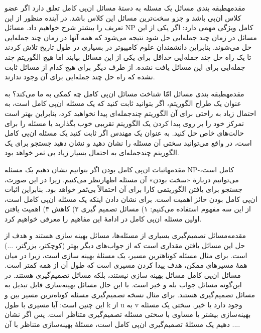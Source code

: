 \begin{itemframe-s}{مقدمه}{طبقه بندی مسائل}
\itm
یک مسئله به دستهٔ مسائل ان‌پی کامل
تعلق دارد اگر عضو کلاس ان‌پی باشد و جزو سخت‌ترین مسائل این کلاس باشد. در آینده منظور از این تعریف را بیشتر شرح خواهیم داد.
\itm
مسائل NP کامل ویژگی مهمی دارد: اگر یکی از این مسائل در زمان چند جمله‌ایی حل شود نتیجه می‌شود که همه آنها در زمان چند جمله‌ایی حل می‌شوند.
 \itm
بنابراین دانشمندان علوم کامپیوتر در بسیاری در طول تاریخ تلاش کردند تا یک راه حل چند جمله‌ایی حداقل برای یکی از این مسائل بیابند اما هیچ الگوریتم چند جمله‌ایی برای این مسائل یافت نشده.
 \itm
از طرف دیگر برای هیچ کدام از مسائل ثابت نشده که راه حل چند جمله‌ایی برای آن وجود ندارند.
\end{itemframe-s}

\begin{itemframe-s}{مقدمه}{طبقه بندی مسائل}
\itm
امّا شناخت مسائل ان‌پی کامل چه کمکی به ما می‌کند؟
\itm
به عنوان یک طراح الگوریتم، اگر بتوانید ثابت کنید که یک مسئله ان‌پی کامل است، به احتمال زیاد به راحتی برای آن الگوریتم چندجمله‌ای پیدا نخواهید کرد، بنابراین بهتر است تمرکز خود را بر روی پیدا کردن یک الگوریتم تقریبی خوب بگذارید یا مسئله را برای حالت‌های خاص حل کنید.
\itm
به عنوان یک مهندس اگر ثابت کنید یک مسئله ان‌پی کامل است، در واقع می‌توانید سختی آن مسئله را نشان دهید و نشان دهید جستجو برای یک الگوریتم چندجمله‌ای به احتمال بسیار زیاد بی ثمر خواهد بود.
\end{itemframe-s}

\begin{itemframe-s}{مقدمه}{اثبات ان‌پی کامل بودن}
\itm
اگر بتوانیم نشان دهیم یک مسئله NP-کامل است، می‌توانیم دربارهٔ «سخت بودن» آن مسئله اظهارنظر می‌کنیم. زیرا در این صورت، جستجو برای یافتن الگوریتمی کارا برای آن احتمالاً بی‌ثمر خواهد بود.
\itm
بنابراین اثبات ان‌پی کامل بودن حائز اهمیت است. برای نشان دادن اینکه یک مسئله ان‌پی کامل است، از این سه مفهوم استفاده می‌کنیم: ۱) مسائل تصمیم گیری ۲) کاهش ۳) اهمیت یافتن اولین مسئله ان‌پی کامل
\itm
در ادامهٔ این مفاهیم را معرفی خواهیم کرد.
\end{itemframe-s}

\begin{itemframe-s}{مقدمه‌}{مسائل تصمیم‌گیری}
\itm
بسیاری از مسئله‌ها، مسائل بهینه سازی
هستند و هدف از حل این مسائل یافتن مقداری است که از جواب‌های دیگر بهتر (کوچکتر، بزرگتر، ...) است. برای مثال مسئله کوتاهترین مسیر، یک مسئلهٔ بهینه سازی است، زیرا در میان همهٔ مسیرهای ممکن، هدف پیدا کردن مسیری است که طول آن از همه کمتر است.
\itm
مسائل ان‌پی کامل مسائل بهینه سازی نیستند، بلکه مسائل تصمیم‌گیری
هستند. در این‌گونه مسائل جواب بله و خیر است.
\itm
با این حال مسائل بهینه‌سازی قابل تبدیل به مسائل تصمیم‌گیری هستند. برای مثال نسخه تصمیم‌گیری مسئله کوتاه‌ترین مسیر بین و این چنین است: آیا مسیری با طول k از u به v وجود دارد یا خیر.
\itm
سختی یک مسئله بهینه‌سازی بیشتر یا مساوی با سختی مسئله تصمیم‌گیری متناظر است. پس اگر نشان دهیم یک مسئلهٔ تصمیم‌گیری ان‌پی کامل است، مسئلهٔ بهینه‌سازی متناظر با آن ....
\end{itemframe-s}

